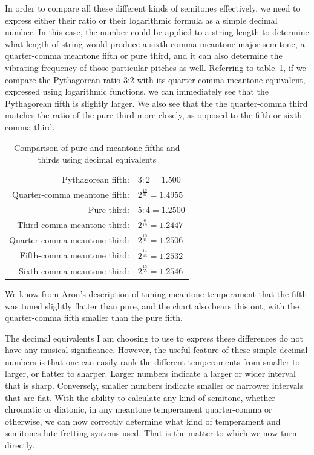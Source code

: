 In order to compare all these different kinds of semitones effectively, we need to
express either their ratio or their logarithmic formula as a simple decimal number. In
this case, the number could be applied to a string length to determine what length of
string would produce a sixth-comma meantone major semitone, a quarter-comma meantone
fifth or pure third, and it can also determine the vibrating frequency of those
particular pitches as well. Referring to table~\ref{fifth-comparison}, if we compare
the Pythagorean ratio 3:2 with its quarter-comma meantone equivalent, expressed using
logarithmic functions, we can immediately see that the Pythagorean fifth is slightly
larger.  We also see that the the quarter-comma third matches the ratio of the
pure third more closely, as opposed to the fifth or sixth-comma third.
\begin{table}[h!]
    \begin{center}
    \begin{tabular}{ r l }
        Pythagorean fifth:            & $ 3:2 = 1.500 $ \\
        Quarter-comma meantone fifth: & $ 2^\frac{18}{31} = 1.4955 $ \\
        \hline
        Pure third:                   & $ 5:4 = 1.2500 $ \\
        Third-comma meantone third:   & $ 2^\frac{6}{19} = 1.2447 $ \\
        Quarter-comma meantone third: & $ 2^\frac{10}{31} = 1.2506 $ \\
        Fifth-comma meantone third:   & $ 2^\frac{14}{43} = 1.2532 $ \\
        Sixth-comma meantone third:   & $ 2^\frac{18}{55} = 1.2546 $ \\
    \end{tabular}
    \end{center}
    \caption{Comparison of pure and meantone fifths and thirds using decimal equivalents}
    \label{fifth-comparison}
\end{table}
We know from Aron's description of tuning meantone temperament that the fifth was
tuned slightly flatter than pure, and the chart also bears this out, with the
quarter-comma fifth smaller than the pure fifth.

The decimal equivalents I am choosing to use to express these differences do not
have any musical significance. However, the useful feature of these simple decimal
numbers is that one can easily rank the different temperaments from smaller to larger,
or flatter to sharper. Larger numbers indicate a larger or wider interval that is
sharp.  Conversely, smaller numbers indicate smaller or narrower intervals that are
flat.  With the ability to calculate any kind of semitone, whether chromatic or
diatonic, in any meantone temperament quarter-comma or otherwise, we can now correctly
determine what kind of temperament and semitones lute fretting systems used.  That is
the matter to which we now turn directly.